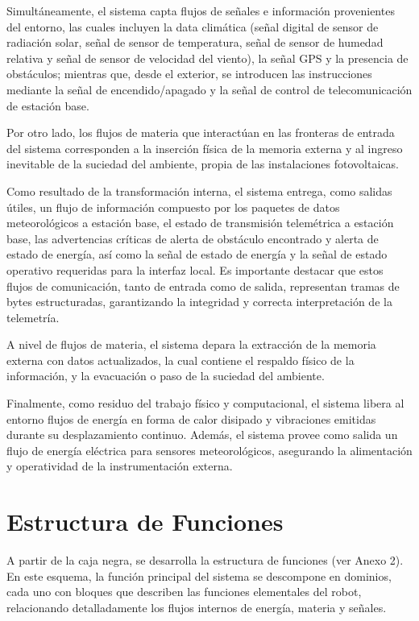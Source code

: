 Simultáneamente, el sistema capta flujos de señales e información provenientes del entorno, las cuales incluyen la data climática (señal digital de sensor de radiación solar, señal de sensor de temperatura, señal de sensor de humedad relativa y señal de sensor de velocidad del viento), la señal GPS y la presencia de obstáculos; mientras que, desde el exterior, se introducen las instrucciones mediante la señal de encendido/apagado y la señal de control de telecomunicación de estación base.

Por otro lado, los flujos de materia que interactúan en las fronteras de entrada del sistema corresponden a la inserción física de la memoria externa y al ingreso inevitable de la suciedad del ambiente, propia de las instalaciones fotovoltaicas.

Como resultado de la transformación interna, el sistema entrega, como salidas útiles, un flujo de información compuesto por los paquetes de datos meteorológicos a estación base, el estado de transmisión telemétrica a estación base, las advertencias críticas de alerta de obstáculo encontrado y alerta de estado de energía, así como la señal de estado de energía y la señal de estado operativo requeridas para la interfaz local. Es importante destacar que estos flujos de comunicación, tanto de entrada como de salida, representan tramas de bytes estructuradas, garantizando la integridad y correcta interpretación de la telemetría.

A nivel de flujos de materia, el sistema depara la extracción de la memoria externa con datos actualizados, la cual contiene el respaldo físico de la información, y la evacuación o paso de la suciedad del ambiente.

Finalmente, como residuo del trabajo físico y computacional, el sistema libera al entorno flujos de energía en forma de calor disipado y vibraciones emitidas durante su desplazamiento continuo. Además, el sistema provee como salida un flujo de energía eléctrica para sensores meteorológicos, asegurando la alimentación y operatividad de la instrumentación externa.


\section{Estructura de Funciones}

A partir de la caja negra, se desarrolla la estructura de funciones (ver Anexo 2). En este esquema, la función principal del sistema se descompone en dominios, cada uno con bloques que describen las funciones elementales del robot, relacionando detalladamente los flujos internos de energía, materia y señales.

